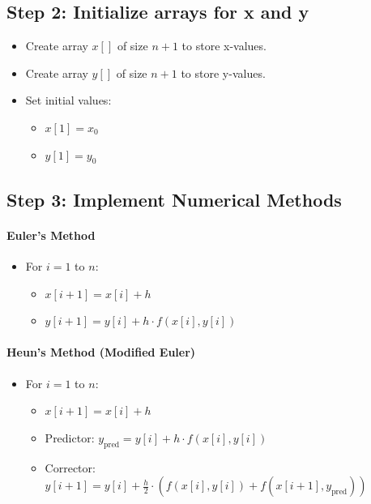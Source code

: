 \documentclass[a4paper,12pt]{article}
\begin{document}
	\subsection*{Step 2: Initialize arrays for x and y}
	\begin{itemize}
		\item Create array \( x[] \) of size \( n+1 \) to store x-values.
		\item Create array \( y[] \) of size \( n+1 \) to store y-values.
		\item Set initial values:
		\begin{itemize}
			\item \( x[1] = x_0 \)
			\item \( y[1] = y_0 \)
		\end{itemize}
	\end{itemize}
	
	\subsection*{Step 3: Implement Numerical Methods}
	
	\paragraph{Euler's Method}
	\begin{itemize}
		\item For \( i = 1 \) to \( n \):
		\begin{itemize}
			\item \( x[i+1] = x[i] + h \)
			\item \( y[i+1] = y[i] + h \cdot f(x[i], y[i]) \)
		\end{itemize}
	\end{itemize}
	
	\paragraph{Heun's Method (Modified Euler)}
	\begin{itemize}
		\item For \( i = 1 \) to \( n \):
		\begin{itemize}
			\item \( x[i+1] = x[i] + h \)
			\item Predictor: \( y_{\text{pred}} = y[i] + h \cdot f(x[i], y[i]) \)
			\item Corrector: \( y[i+1] = y[i] + \frac{h}{2} \cdot \left(f(x[i], y[i]) + f(x[i+1], y_{\text{pred}})\right) \)
		\end{itemize}
	\end{itemize}
	
\end{document}
